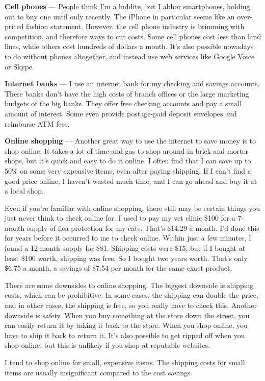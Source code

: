 \textbf{Cell phones} --- People think I'm a luddite, but I abhor smartphones, holding out to buy one until only recently. The iPhone in particular seems like an over-priced fashion statement. However, the cell phone industry is brimming with competition, and therefore ways to cut costs. Some cell phones cost less than land lines, while others cost hundreds of dollars a month. It's also possible nowadays to do without phones altogether, and instead use web services like Google Voice or Skype.

\textbf{Internet banks} --- I use an internet bank for my checking and savings accounts. These banks don't have the high costs of branch offices or the large marketing budgets of the big banks. They offer free checking accounts and pay a small amount of interest. Some even provide postage-paid deposit envelopes and reimburse ATM fees.

\textbf{Online shopping} --- Another great way to use the internet to save money is to shop online. It takes a lot of time and gas to shop around in brick-and-morter shops, but it's quick and easy to do it online. I often find that I can save up to 50\% on some very expensive items, even after paying shipping. If I can't find a good price online, I haven't wasted much time, and I can go ahead and buy it at a local shop.

Even if you're familiar with online shopping, there still may be certain things you just never think to check online for. I used to pay my vet clinic \$100 for a 7-month supply of flea protection for my cats. That's \$14.29 a month. I'd done this for years before it occurred to me to check online. Within just a few minutes, I found a 12-month supply for \$81. Shipping costs were \$15, but if I bought at least \$100 worth, shipping was free. So I bought two years worth. That's only \$6.75 a month, a savings of \$7.54 per month for the same exact product.

There are some downsides to online shopping. The biggest downside is shipping costs, which can be prohibitive. In some cases, the shipping can double the price, and in other cases, the shipping is free, so you really have to check this. Another downside is safety. When you buy something at the store down the street, you can easily return it by taking it back to the store. When you shop online, you have to ship it back to return it. It's also possible to get ripped off when you shop online, but this is unlikely if you shop at reputable websites.

I tend to shop online for small, expensive items. The shipping costs for small items are usually insignificant compared to the cost savings.

